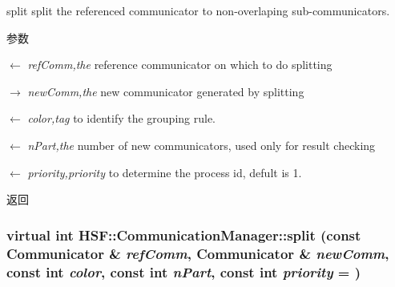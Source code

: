 split split the referenced communicator to non-\/overlaping sub-\/communicators. 
\begin{DoxyParams}{参数}
\item[\mbox{$\leftarrow$} {\em refComm,the}]reference communicator on which to do splitting \item[\mbox{$\rightarrow$} {\em newComm,the}]new communicator generated by splitting \item[\mbox{$\leftarrow$} {\em color,tag}]to identify the grouping rule. \item[\mbox{$\leftarrow$} {\em nPart,the}]number of new communicators, used only for result checking \item[\mbox{$\leftarrow$} {\em priority,priority}]to determine the process id, defult is 1. \end{DoxyParams}
\begin{DoxyReturn}{返回}

\end{DoxyReturn}
\hypertarget{classHSF_1_1CommunicationManager_abf8f44565535ca264f90ea7c44baf618}{
\subsubsection[{split}]{\setlength{\rightskip}{0pt plus 5cm}virtual int HSF::CommunicationManager::split (const {\bf Communicator} \& {\em refComm}, \/  {\bf Communicator} \& {\em newComm}, \/  const int {\em color}, \/  const int {\em nPart}, \/  const int {\em priority} = {})}}
\label{classHSF_1_1CommunicationManager_abf8f44565535ca264f90ea7c44baf618}


